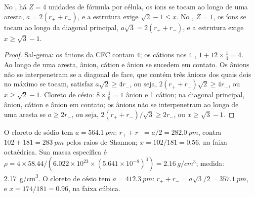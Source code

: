 \begin{proposition}\label{prop:b1:crystals-ionic-covalent:nacl-cscl}
No , há $Z = 4$ unidades de fórmula por célula, os íons se
tocam ao longo de uma aresta, $a = 2(r_+ + r_-)$, e a estrutura exige
$\sqrt2 - 1
\le x$. No , $Z = 1$, os íons se tocam
ao longo da diagonal principal, $a\sqrt3 = 2(r_+ + r_-)$, e a estrutura
exige
$x \ge \sqrt3 - 1$.
\end{proposition}

\begin{proof}
Sal-gema: os ânions da  CFC contam $4$; os cátions nos 4 , $1 + 12 \times \frac14 = 4$. Ao longo de uma aresta,
ânion, cátion e ânion se sucedem em contato. Os ânions não se
interpenetram se a diagonal de face, que contém três ânions dos quais
dois no máximo se tocam, satisfaz $a\sqrt2 \ge 4r_-$, ou seja,
$2(r_+ + r_-)\sqrt2 \ge
4r_-$, ou $x \ge \sqrt2 - 1$. Cloreto de césio: $8 \times \frac18 = 1$
ânion e 1 cátion; na diagonal principal, ânion, cátion e ânion em
contato; os ânions não se interpenetram ao longo de uma aresta se
$a \ge 2r_-$, ou seja,
$2(r_+ + r_-)/\sqrt3 \ge 2r_-$, ou $x \ge \sqrt3 - 1$.
\end{proof}

\begin{example}\label{ex:b1:crystals-ionic-covalent:nacl}
O cloreto de sódio tem $a = \qty{564.1}{pm}$: $r_+ + r_- = a/2 =
\qty{282.0}{pm}$, contra $102 + 181 = \qty{283}{pm}$ pelos raios de
Shannon; $x = 102/181 = 0.56$, na faixa octaédrica. Sua massa específica
é $\rho = 4 \times 58.44/(6.022 \times 10^{23} \times (5.641 \times
10^{-8})^3) = \qty{2.16}{g/cm^3}$; medida: \qty{2.17}{g/cm^3}. O cloreto
de césio tem $a = \qty{412.3}{pm}$: $r_+ + r_- = a\sqrt3/2 =
\qty{357.1}{pm}$, e $x = 174/181 = 0.96$, na faixa cúbica.
\end{example}

